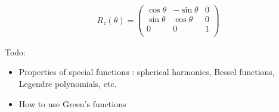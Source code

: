 \documentclass[10pt]{article}
\begin{document}
\begin{multicols}{2}
\begin{align*}
 		&  R_z (\theta) = \begin{pmatrix}
 			\cos \theta & -\sin \theta & 0 \\
 			\sin \theta & \cos \theta & 0 \\
 			0 & 0 & 1 \\
 		\end{pmatrix}\tag*{Rotation matrix about z-axis} \\
	\end{align*}	
	\setlength{\abovedisplayskip}{-25pt}
	\setlength{\belowdisplayskip}{0pt}
	\setlength{\abovedisplayshortskip}{0pt}
	\setlength{\belowdisplayshortskip}{0pt}
	\begin{align*} 
 	\end{align*}
 	Todo:
 	\begin{itemize}
 		\item Properties of special functions : spherical harmonics, Bessel functions, Legendre polynomials, etc.
 		\item How to use Green's functions
 	\end{itemize}
\end{multicols}
 
\end{document}
